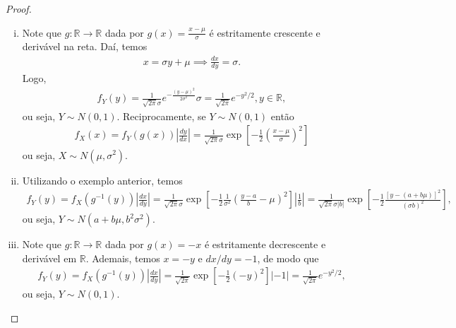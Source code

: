 \documentclass[../Notas.tex]{subfiles}
\begin{document}
\begin{proof}
\begin{enumerate}[(i)]
    \item Note que $g:\mathbb{R}\to\mathbb{R}$ dada por $g(x) = \displaystyle{ \frac{x-\mu}{\sigma} }$ é estritamente crescente e derivável na reta. Daí, temos
    \begin{align*}
        x = \sigma y + \mu \implies \frac{dx}{dy} = \sigma.
    \end{align*}
    Logo, 
    \begin{align*}
        f_Y(y) = \frac{1}{\sqrt{2\pi}\sigma}e^{ -\frac{(y-\mu)^2}{2\sigma^2} }\sigma = \frac{1}{\sqrt{2\pi}}e^{-y^2/2}, y\in\mathbb{R},
    \end{align*}
    ou seja, $Y\sim N(0,1)$. Reciprocamente, se $Y\sim N(0,1)$ então
    \begin{align*}
        f_X(x) = f_Y(g(x))\left|\frac{dy}{dx}\right| = \frac{1}{\sqrt{2\pi}\sigma}\exp[-\frac{1}{2}(\frac{x-\mu}{\sigma})^2]
    \end{align*}
    ou seja, $X\sim N(\mu, \sigma^2)$.
    \item Utilizando o exemplo anterior, temos
    \begin{align*}
        f_Y(y) = f_X(g^{-1}(y))\left|\frac{dx}{dy}\right| = \frac{1}{\sqrt{2\pi}\sigma}\exp[-\frac{1}{2}\frac{1}{\sigma^2}(\frac{y-a}{b} - \mu)^2]\left|\frac{1}{b}\right| = \frac{1}{\sqrt{2\pi}\sigma|b|} \exp[ -\frac{1}{2}\frac{ [ y - (a+b\mu) ]^2 }{ (\sigma b)^2 } ],
    \end{align*}
    ou seja, $Y\sim N(a + b\mu, b^2\sigma^2)$.
    \item Note que $g:\mathbb{R}\to\mathbb{R}$ dada por $g(x) = -x$ é estritamente decrescente e derivável em $\mathbb{R}$. Ademais, temos $x = -y$ e $dx/dy = -1$, de modo que
    \begin{align*}
        f_Y(y) = f_X(g^{-1}(y)) \left|\frac{dx}{dy}\right| = \frac{1}{\sqrt{2\pi}}\exp[ -\frac{1}{2}(-y)^2 ]|-1| = \frac{1}{\sqrt{2\pi}} e^{-y^2/2},
    \end{align*}
    ou seja, $Y\sim N(0,1)$.
\end{enumerate}
\end{proof}
\end{document}
